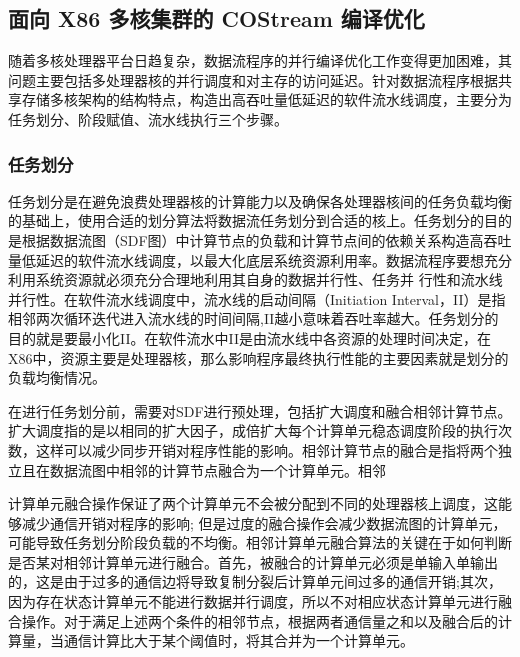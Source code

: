 \subsection{面向 X86 多核集群的 COStream 编译优化} \label{section:x86}

随着多核处理器平台日趋复杂，数据流程序的并行编译优化工作变得更加困难，其问题主要包括多处理器核的并行调度和对主存的访问延迟。针对数据流程序根据共享存储多核架构的结构特点，构造出高吞吐量低延迟的软件流水线调度，主要分为任务划分、阶段赋值、流水线执行三个步骤。

\subsubsection{任务划分}

任务划分是在避免浪费处理器核的计算能力以及确保各处理器核间的任务负载均衡的基础上，使用合适的划分算法将数据流任务划分到合适的核上。任务划分的目的是根据数据流图（SDF图）中计算节点的负载和计算节点间的依赖关系构造高吞吐量低延迟的软件流水线调度，以最大化底层系统资源利用率。数据流程序要想充分利用系统资源就必须充分合理地利用其自身的数据并行性、任务并 行性和流水线并行性。在软件流水线调度中，流水线的启动间隔（Initiation Interval，II）是指相邻两次循环迭代进入流水线的时间间隔,II越小意味着吞吐率越大。任务划分的目的就是要最小化II。在软件流水中II是由流水线中各资源的处理时间决定，在X86中，资源主要是处理器核，那么影响程序最终执行性能的主要因素就是划分的负载均衡情况。

在进行任务划分前，需要对SDF进行预处理，包括扩大调度和融合相邻计算节点。扩大调度指的是以相同的扩大因子，成倍扩大每个计算单元稳态调度阶段的执行次数，这样可以减少同步开销对程序性能的影响。相邻计算节点的融合是指将两个独立且在数据流图中相邻的计算节点融合为一个计算单元。相邻

计算单元融合操作保证了两个计算单元不会被分配到不同的处理器核上调度，这能够减少通信开销对程序的影响; 但是过度的融合操作会减少数据流图的计算单元，可能导致任务划分阶段负载的不均衡。相邻计算单元融合算法的关键在于如何判断是否某对相邻计算单元进行融合。首先，被融合的计算单元必须是单输入单输出的，这是由于过多的通信边将导致复制分裂后计算单元间过多的通信开销;其次，因为存在状态计算单元不能进行数据并行调度，所以不对相应状态计算单元进行融合操作。对于满足上述两个条件的相邻节点，根据两者通信量之和以及融合后的计算量，当通信计算比大于某个阈值时，将其合并为一个计算单元。

